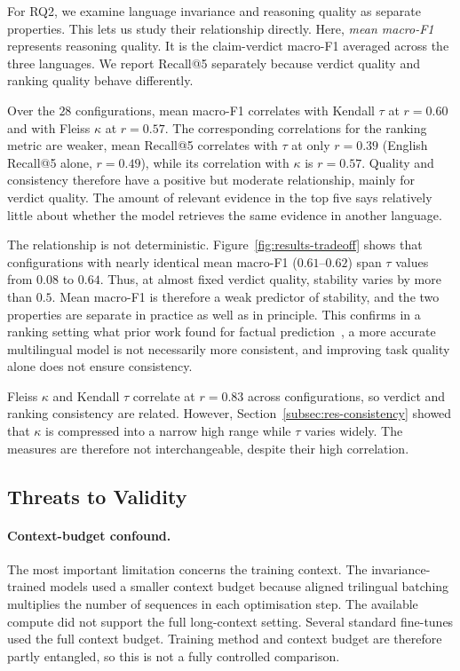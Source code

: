 For RQ2, we examine language invariance and reasoning quality as separate properties. This lets us
study their relationship directly. Here, \emph{mean macro-F1} represents
reasoning quality. It is the claim-verdict macro-F1 averaged across the three languages. We report
Recall@5 separately because verdict quality and ranking quality behave differently.

Over the $28$ configurations, mean macro-F1 correlates with Kendall $\tau$ at $r = 0.60$ and with
Fleiss $\kappa$ at $r = 0.57$. The corresponding correlations for the ranking metric are weaker,
mean Recall@5 correlates with $\tau$ at only $r = 0.39$ (English Recall@5 alone, $r = 0.49$), while
its correlation with $\kappa$ is $r = 0.57$. Quality and consistency therefore have a positive but
moderate relationship, mainly for verdict quality. The amount of relevant evidence in the top five
says relatively little about whether the model retrieves the same evidence in another language.

The relationship is not deterministic. Figure~\ref{fig:results-tradeoff} shows that configurations
with nearly identical mean macro-F1 ($0.61$--$0.62$) span $\tau$ values from $0.08$ to $0.64$. Thus,
at almost fixed verdict quality, stability varies by more than $0.5$. Mean macro-F1 is therefore a
weak predictor of stability, and the two properties are separate in practice as well as in principle.
This confirms in a ranking setting what prior work found for factual
prediction~\cite{elazar2021measuringimprovingconsistencypretrained,Qi_2023}, a more accurate
multilingual model is not necessarily more consistent, and improving task quality alone does not
ensure consistency.

Fleiss $\kappa$ and Kendall $\tau$ correlate at $r = 0.83$ across configurations, so verdict and
ranking consistency are related. However, Section~\ref{subsec:res-consistency} showed that $\kappa$
is compressed into a narrow high range while $\tau$ varies widely. The measures are therefore not
interchangeable, despite their high correlation.

\subsection{Threats to Validity}
\label{subsec:res-threats}

\paragraph{Context-budget confound.}
The most important limitation concerns the training context. The invariance-trained models used a
smaller context budget because aligned trilingual batching multiplies the number of sequences in each
optimisation step. The available compute did not support the full long-context setting. Several
standard fine-tunes used the full context budget. Training method and context budget are therefore
partly entangled, so this is not a fully controlled comparison.

